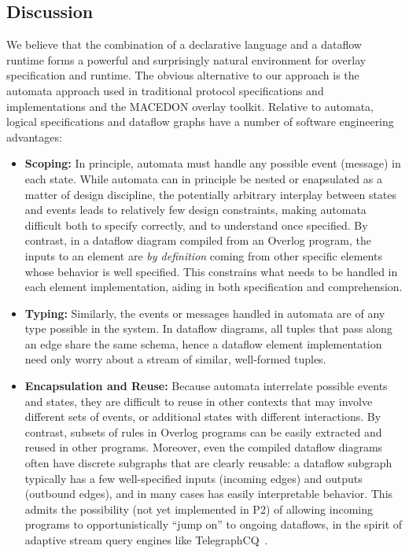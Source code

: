 \documentclass[twocolumn,10pt]{article}
\def\Sys{P2\xspace}
\def\Lang{Overlog\xspace}
\begin{document}
\subsection{Discussion}
\label{sec:approach-discuss}
We believe that the combination of a declarative language and a
 dataflow runtime forms a powerful and surprisingly natural
 environment for overlay specification and runtime.  The obvious
 alternative to our approach is the automata approach used in
 traditional protocol specifications and implementations and the
 MACEDON overlay toolkit.  Relative to automata, logical
 specifications and dataflow graphs have a number of software
 engineering advantages:
\begin{itemize}
\item {\bf Scoping:} In principle, automata must handle any possible
  event (message) in each state.  While automata can in principle be
  nested or enapsulated as a matter of design discipline, the
  potentially arbitrary interplay between states and events leads to
  relatively few design constraints, making automata difficult both to
  specify correctly, and to understand once specified.  By contrast, in
  a dataflow diagram compiled from an \Lang program, the inputs to an
  element are {\em by definition} coming from other
  specific elements whose behavior is well specified.  This constrains
  what needs to be handled in each element implementation,
  aiding in both specification and comprehension.
\item {\bf Typing:} Similarly, the events or messages 
  handled in automata are of any type possible in the system.  In
  dataflow diagrams, all tuples that pass along an edge share the same
  schema, hence a dataflow element implementation
  need only worry about a stream of similar, well-formed tuples.
\item {\bf Encapsulation and Reuse:} Because automata interrelate
  possible events and states, they are difficult to reuse in other
  contexts that may involve different sets of events, or additional
  states with different interactions.  By contrast, subsets of rules
  in \Lang programs can be easily extracted and reused in other
  programs.  Moreover, even the compiled dataflow
  diagrams often have discrete subgraphs that are clearly reusable: a
  dataflow subgraph typically has a few well-specified inputs
  (incoming edges) and outputs (outbound edges), and in many cases has
  easily interpretable behavior.  This admits the possibility (not yet
  implemented in \Sys) of allowing incoming programs to
  opportunistically ``jump on'' to ongoing dataflows, in the spirit of
  adaptive stream query engines like TelegraphCQ~\cite{telegraphcq}.
\end{itemize}
\end{document}
